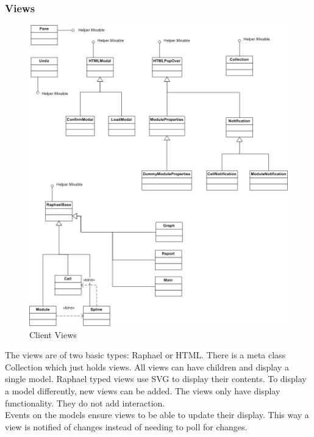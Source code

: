 \documentclass{report}
\begin{document}
				\subsubsection{Views}
					\begin{figure}[htb]
						\begin{center}
							\includegraphics[width=\linewidth]{views.png}
							\caption{Client Views}
							\label{fig: cmodels}
						\end{center}
					\end{figure}	
					The views are of two basic types: Raphael or HTML. There is a meta class Collection which just holds views. All views can have children and display a single model. Raphael typed views use SVG to display their contents. To display a model differently, new views can be added. The views only have display functionality. They do not add interaction. \\
					Events on the models ensure views to be able to update their display. This way a view is notified of changes instead of needing to poll for changes.
					
\end{document}
